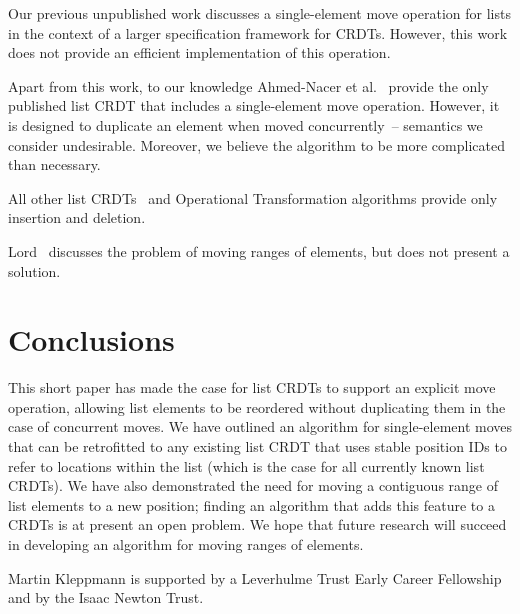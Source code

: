 \documentclass[sigplan,10pt]{acmart}
\begin{document}
Our previous unpublished work \cite{ExtendedVersion} discusses a single-element move operation for lists in the context of a larger specification framework for CRDTs.
However, this work does not provide an efficient implementation of this operation.

Apart from this work, to our knowledge Ahmed-Nacer et al.~\cite{AhmedNacer:2013eq} provide the only published list CRDT that includes a single-element move operation.
However, it is designed to duplicate an element when moved concurrently~-- semantics we consider undesirable.
Moreover, we believe the algorithm to be more complicated than necessary.

All other list CRDTs~\cite{Oster:2006wj,Preguica:2009fz,Roh:2011dw,Grishchenko:2014eh,Attiya:2016kh,Weiss:2009ht,Weiss:2010hx,Nedelec:2013ky,Nedelec:2016eo} and Operational Transformation algorithms \cite{Ellis:1989ue,Nichols:1995fd,Ressel:1996wx,Sun:1998vf,Oster:2006tr} provide only insertion and deletion.

Lord~\cite{Lord:2019bo} discusses the problem of moving ranges of elements, but does not present a solution.

\section{Conclusions}

This short paper has made the case for list CRDTs to support an explicit move operation, allowing list elements to be reordered without duplicating them in the case of concurrent moves.
We have outlined an algorithm for single-element moves that can be retrofitted to any existing list CRDT that uses stable position IDs to refer to locations within the list (which is the case for all currently known list CRDTs).
We have also demonstrated the need for moving a contiguous range of list elements to a new position; finding an algorithm that adds this feature to a CRDTs is at present an open problem.
We hope that future research will succeed in developing an algorithm for moving ranges of elements.

\begin{acks}
Martin Kleppmann is supported by a Leverhulme Trust Early Career Fellowship and by the Isaac Newton Trust.
\end{acks}

\balance

{}
\end{document}
